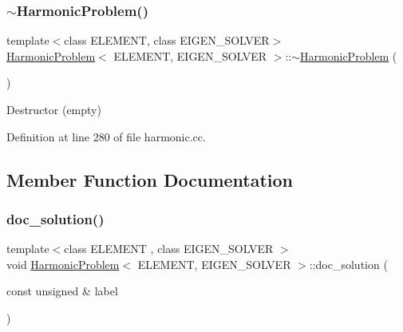 \mbox{\label{classHarmonicProblem_a929be27d0bb040eef28336b2145b5a59}} 
\subsubsection{\texorpdfstring{$\sim$\+Harmonic\+Problem()}{~HarmonicProblem()}}
{\footnotesize\ttfamily template$<$class E\+L\+E\+M\+E\+NT, class E\+I\+G\+E\+N\+\_\+\+S\+O\+L\+V\+ER$>$ \\
\hyperlink{classHarmonicProblem}{Harmonic\+Problem}$<$ E\+L\+E\+M\+E\+NT, E\+I\+G\+E\+N\+\_\+\+S\+O\+L\+V\+ER $>$\+::$\sim$\hyperlink{classHarmonicProblem}{Harmonic\+Problem} (\begin{DoxyParamCaption}{ }\end{DoxyParamCaption})\hspace{0.3cm}{\ttfamily [inline]}}



Destructor (empty) 



Definition at line 280 of file harmonic.\+cc.



\subsection{Member Function Documentation}
\mbox{\label{classHarmonicProblem_a95e94f87cf4f63e332c09bd9f1bbae7c}} 
\subsubsection{\texorpdfstring{doc\+\_\+solution()}{doc\_solution()}}
{\footnotesize\ttfamily template$<$class E\+L\+E\+M\+E\+NT , class E\+I\+G\+E\+N\+\_\+\+S\+O\+L\+V\+ER $>$ \\
void \hyperlink{classHarmonicProblem}{Harmonic\+Problem}$<$ E\+L\+E\+M\+E\+NT, E\+I\+G\+E\+N\+\_\+\+S\+O\+L\+V\+ER $>$\+::doc\+\_\+solution (\begin{DoxyParamCaption}\item[{const unsigned \&}]{label }\end{DoxyParamCaption})}




